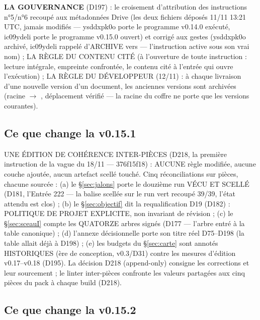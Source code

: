\textbf{LA GOUVERNANCE} (D197) : le croisement d'attribution des
instructions n°5/n°6 recoupé aux métadonnées Drive (les deux fichiers
déposés 11/11 13:21 UTC, jamais modifiés — ysddxpk0o porte le programme
v0.14.0 exécuté, ic09ydeli porte le programme v0.15.0 ouvert) et
corrigé aux gestes (ysddxpk0o archivé, ic09ydeli rappelé d'ARCHIVE
vers  — l'instruction active sous son vrai nom) ;
LA RÈGLE DU CONTENU CITÉ (à l'ouverture de toute instruction : lecture
intégrale, empreinte confrontée, le contenu cité à l'entrée qui ouvre
l'exécution) ; LA RÈGLE DU DÉVELOPPEUR (12/11) : à chaque livraison
d'une nouvelle version d'un document, les anciennes versions sont
archivées (racine $\to$ , déplacement vérifié — la
racine du coffre ne porte que les versions courantes).

\subsection{Ce que change la v0.15.1}\label{sec:nouveautes151}

UNE ÉDITION DE COHÉRENCE INTER-PIÈCES (D218, la première instruction
de la vague du 18/11 — 376f15f18) : AUCUNE règle modifiée, aucune
couche ajoutée, aucun artefact scellé touché. Cinq réconciliations sur
pièces, chacune sourcée : (a) le §\ref{sec:jalons} porte le douzième
run VÉCU ET SCELLÉ (D181, l'Entrée 222 — la balise 
scellée sur le run vert recoupé 39/39, l'état attendu est clos) ;
(b) le §\ref{sec:objectif} dit la requalification D19 (D182) :
POLITIQUE DE PROJET EXPLICITE, non invariant de révision ; (c) le
§\ref{sec:sceauI} compte les QUATORZE arbres signés (D177 — l'arbre
 entré à la table canonique) ; (d) l'annexe décisionnelle
porte son titre réel D75--D198 (la table allait déjà à D198) ; (e) les
budgets du §\ref{sec:carte} sont annotés HISTORIQUES (ère de
conception, v0.3/D31) contre les mesures d'édition v0.17--v0.18
(D195). La décision D218 (append-only) consigne les corrections et
leur sourcement ; le linter inter-pièces confronte les valeurs
partagées aux cinq pièces du pack à chaque build (D218).

\subsection{Ce que change la v0.15.2}\label{sec:nouveautes152}

